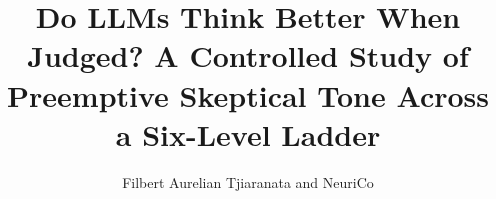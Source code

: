\documentclass{article}
\title{Do LLMs Think Better When Judged? A Controlled Study of Preemptive Skeptical Tone Across a Six-Level Ladder}
\author{Filbert Aurelian Tjiaranata and NeuriCo}
\begin{document}
\maketitle

\begin{abstract}

\end{abstract}









\end{document}

